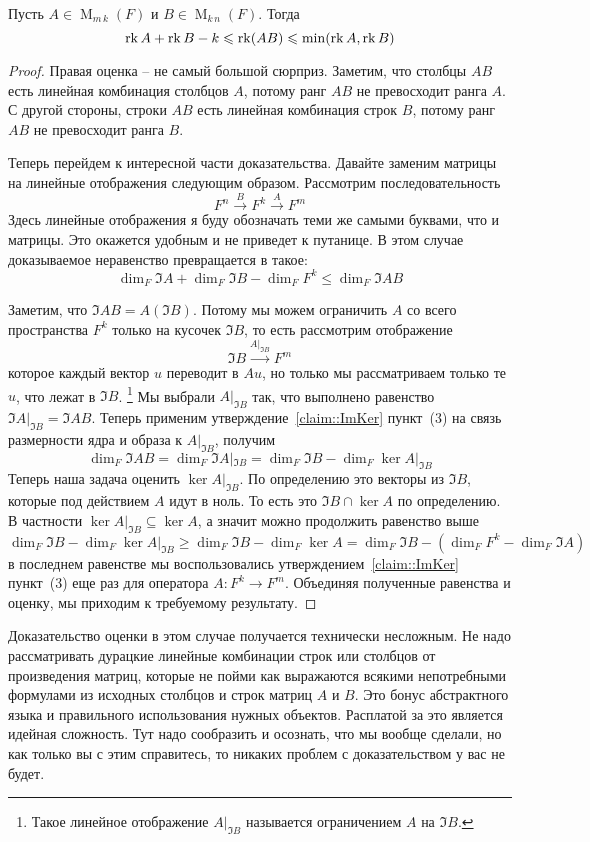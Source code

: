 \begin{claim}
Пусть $A\in \operatorname{M}_{m\,k}(F)$ и $B\in\operatorname{M}_{k\,n}(F)$.
Тогда
\[
\operatorname{rk} A +\operatorname{rk} B - k \leqslant \operatorname{rk} (AB )\leqslant \min(\operatorname{rk} A, \operatorname{rk} B)
\]
\end{claim}
\begin{proof}
Правая оценка -- не самый большой сюрприз.
Заметим, что столбцы $AB$ есть линейная комбинация столбцов $A$, потому ранг $AB$ не превосходит ранга $A$.
С другой стороны, строки $AB$ есть линейная комбинация строк $B$, потому ранг $AB$ не превосходит ранга $B$.

Теперь перейдем к интересной части доказательства.
Давайте заменим матрицы на линейные отображения следующим образом.
Рассмотрим последовательность 
\[
F^n \stackrel{B}{\longrightarrow} F^k \stackrel{A}{\longrightarrow} F^m
\]
Здесь линейные отображения я буду обозначать теми же самыми буквами, что и матрицы.
Это окажется удобным и не приведет к путанице.
В этом случае доказываемое неравенство превращается в такое:
\[
\dim_F \Im A + \dim_F \Im B - \dim_F F^k \leqslant \dim_F\Im AB
\]

Заметим, что $\Im AB = A(\Im B)$.
Потому мы можем ограничить $A$ со всего пространства $F^k$ только на кусочек $\Im B$, то есть рассмотрим отображение
\[
\Im B \stackrel{A|_{\Im B}}{\longrightarrow} F^m
\]
которое каждый вектор $u$ переводит в $Au$, но только мы рассматриваем только те $u$, что лежат в $\Im B$.%
\footnote{Такое линейное отображение $A|_{\Im B}$ называется ограничением $A$ на $\Im B$.}
Мы выбрали $A|_{\Im B}$ так, что выполнено равенство $\Im A|_{\Im B} = \Im AB$.
Теперь применим утверждение~\ref{claim::ImKer} пункт~(3) на связь размерности ядра и образа к $A|_{\Im B}$, получим
\[
\dim_F \Im AB = \dim_F \Im A|_{\Im B} = \dim_F \Im B - \dim_F \ker A|_{\Im B}
\]
Теперь наша задача оценить $\ker A|_{\Im B}$.
По определению это векторы из $\Im B$, которые под действием $A$ идут в ноль.
То есть это $\Im B \cap \ker A$ по определению.
В частности $\ker A|_{\Im B}\subseteq \ker A$, а значит можно продолжить равенство выше
\[
\dim_F \Im B - \dim_F \ker A|_{\Im B}\geqslant \dim_F \Im B - \dim_F \ker A = \dim_F \Im B - (\dim_F F^k - \dim_F \Im A)
\]
в последнем равенстве мы воспользовались утверждением~\ref{claim::ImKer} пункт~(3) еще раз для оператора $A\colon F^k \to F^m$.
Объединяя полученные равенства и оценку, мы приходим к требуемому результату.
\end{proof}

Доказательство оценки в этом случае получается технически несложным.
Не надо рассматривать дурацкие линейные комбинации строк или столбцов от произведения матриц, которые не пойми как выражаются всякими непотребными формулами из исходных столбцов и строк матриц $A$ и $B$.
Это бонус абстрактного языка и правильного использования нужных объектов.
Расплатой за это является идейная сложность.
Тут надо сообразить и осознать, что мы вообще сделали, но как только вы с этим справитесь, то никаких проблем с доказательством у вас не будет.

